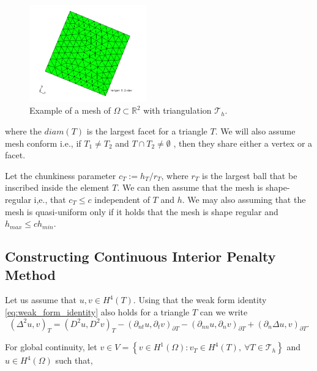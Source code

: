 \begin{figure}[!h]
    \centering
    \includegraphics[width=0.45\textwidth]{figures/mesh.jpg}
    \caption{Example of a mesh of $\Omega \subset \mathbb{R} ^{2}$ with triangulation $\mathcal{T} _{h}$.    }
    \label{fig:mesh_example}
\end{figure}

where the $diam( T )$ is the largest facet for a triangle $T$. We will also assume mesh conform i.e., if $T_{1} \neq T_{2 }$  and $T \cap T_{2} \neq \emptyset  $ , then they share either a vertex or a facet.

Let the chunkiness parameter $c_{T} := h_{T}/r_{T}$, where $r_{T}$  is the largest ball that be inscribed inside the element $T$. We can then assume that the mesh is shape-regular i,e., that $c_{T}\le  c$ independent of $T$  and $h$. We may also assuming that
the mesh is quasi-uniform only if it holds that the mesh is shape regular and $h_{max} \le  c h_{min}$.




\subsection{Constructing Continuous Interior Penalty Method}%
\label{sub:constructing_continious_interior_penalty_method}

 Let us assume that $u,v \in
H^{4}\left( T  \right) $. Using that the weak form identity \eqref{eq:weak_form_identity} also holds for a triangle $T$ can we write
\begin{equation}
\label{eq:bi_basic_dg}
\left( \Delta  ^{2} u,v \right) _{T} =  \left( D^2u,D^2v \right) _{T } - \left(\partial _{nt} u, \partial _{t}v
\right)_{\partial T} - \left(\partial _{nn} u, \partial _{n}v \right)_{\partial T} + \left(\partial _{n} \Delta  u,v
\right)_{\partial T}
.\end{equation}

For global continuity, let  $v \in V =  \left\{ v \in H^{1}\left( \Omega  \right): v_{T} \in  H^{4}\left( T \right), \ \forall T \in
\mathcal{T}_{h}    \right\} $ and $u \in  H^{4}\left( \Omega  \right) $ such that,

